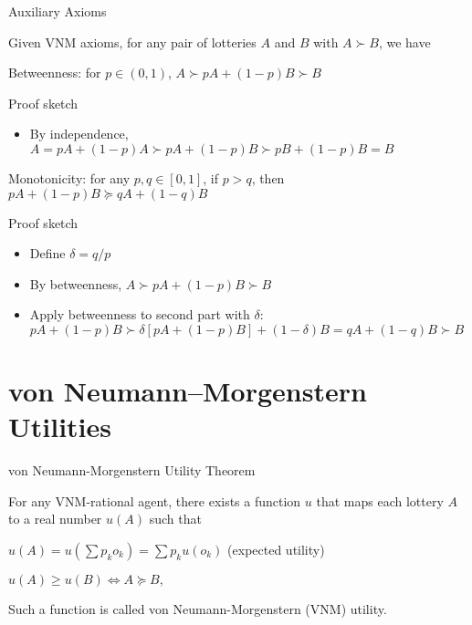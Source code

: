 \documentclass[11pt,aspectratio=169,handout]{beamer}
\begin{document}
  \begin{frame}{Auxiliary Axioms}
   \begin{Lemma}
    Given VNM axioms, for any pair of lotteries $A$ and $B$ with $A \succ B$, we have
    \begin{itemizes}[1em]
     \item<1->\alert<1>{Betweenness}: for $p\in (0,1)$, $A \succ pA + (1-p)B \succ B$
      \item<3->[] {\color{blue} Proof sketch}
     \begin{itemize}
      \item By independence, $A = pA + (1-p)A \succ pA + (1-p)B \succ pB + (1-p) B = B$
     \end{itemize}
     \item<2->\alert<2>{Monotonicity}: for any $p,q\in [0,1]$, if $p > q$, then $pA + (1-p)B \succeq qA + (1-q)B$
     \item<4->[] {\color{blue} Proof sketch}
     \begin{itemize}
      \item Define $\delta = q/p$
      \item By betweenness, $A\succ pA + (1-p)B \succ B$
      \item Apply betweenness to second part with $\delta$: $pA + (1-p)B \succ \delta[pA  + (1-p)B] + (1-\delta) B = qA + (1-q)B \succ B$
     \end{itemize}
    \end{itemizes}
   \end{Lemma}
  \end{frame}
  
 \section{von Neumann–Morgenstern Utilities}
  \begin{frame}{von Neumann-Morgenstern Utility Theorem}
   \begin{theorem}
    For any VNM-rational agent, there exists a function $u$ that maps each lottery $A$ to a real number $u(A)$ such that 
    \begin{itemizes}
     \item $u(A) = u\left(\sum p_k o_k\right) = \sum p_k u(o_k)$ (\alert{expected utility})
     \item $u(A) \ge u(B) \Longleftrightarrow A \succeq B,$
    \end{itemizes}
    \vspace{1em}
    Such a function is called von Neumann-Morgenstern (VNM) utility. 
   \end{theorem}
  \end{frame}
  
\end{document}
